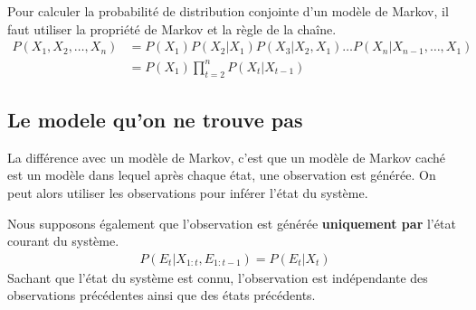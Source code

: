Pour calculer la probabilité de distribution conjointe d'un modèle de Markov, 
il faut utiliser la propriété de Markov et la règle de la chaîne. 
\begin{align*}
    P(X_1, X_2, \dots, X_n) &= P(X_1) P(X_2 | X_1) P(X_3 | X_2, X_1) \dots P(X_n | X_{n-1}, \dots, X_1) \\
                            &= P(X_1) \prod_{t=2}^n P(X_t | X_{t-1}) 
\end{align*}

\subsection{Le modele qu'on ne trouve pas} %
\label{sub:le_modele_qu_on_ne_trouve_pas}

La différence avec un modèle de Markov, c'est que un modèle de Markov caché est un modèle 
dans lequel après chaque état, une observation est générée. On peut alors 
utiliser les observations pour inférer l'état du système.

Nous supposons également que l'observation est générée \textbf{uniquement par } l'état courant du système.
\begin{align*}
    P(E_t | X_{1:t}, E_{1:t-1} ) = P(E_t | X_t) 
\end{align*}
Sachant que l'état du système est connu, l'observation est indépendante des observations précédentes 
ainsi que des états précédents.

